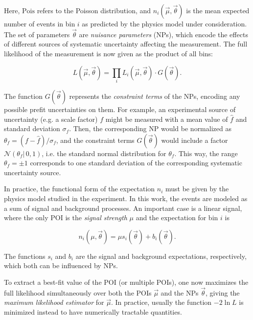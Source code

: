 Here, $\mathrm{Pois}$ refers to the Poisson distribution, and $n_i (\vec{\mu}, \vec{\theta})$ is the mean expected number of events in bin $i$ as predicted by the physics model under consideration. The set of parameters $\vec{\theta}$ are \textit{nuisance parameters} (NPs), which encode the effects of different sources of systematic uncertainty affecting the measurement. The full likelihood of the measurement is now given as the product of all bins:

\begin{equation}
    L (\vec{\mu}, \vec{\theta}) = \prod_i L_i (\vec{\mu}, \vec{\theta}) \cdot G(\vec{\theta}).
\end{equation}

The function $G(\vec{\theta})$ represents the \textit{constraint terms} of the NPs, encoding any possible prefit uncertainties on them. For example, an experimental source of uncertainty (e.g. a scale factor) $f$ might be measured with a mean value of $\hat{f}$ and standard deviation $\sigma_f$. Then, the corresponding NP would be normalized as $\theta_f = (f-\hat{f})/\sigma_f$, and the constraint terms $G(\vec{\theta})$ would include a factor $\mathcal{N}(\theta_f | \, 0,1)$, i.e. the standard normal distribution for $\theta_f$. This way, the range $\theta_f = \pm 1$ corresponds to one standard deviation of the corresponding systematic uncertainty source.

In practice, the functional form of the expectation $n_i$ must be given by the physics model studied in the experiment. In this work, the events are modeled as a sum of signal and background processes. An important case is a linear signal, where the only POI is the \textit{signal strength} $\mu$ and the expectation for bin $i$ is

\begin{equation}
\label{eq:methods:linearsignal}
    n_i (\mu, \vec{\theta}) = \mu s_i (\vec{\theta}) + b_i (\vec{\theta}).
\end{equation}

The functions $s_i$ and $b_i$ are the signal and background expectations, respectively, which both can be influenced by NPs. 

To extract a best-fit value of the POI (or multiple POIs), one now maximizes the full likelihood simultaneously over both the POIs $\vec{\mu}$ and the NPs $\vec{\theta}$, giving the \textit{maximum likelihood estimator} for $\vec{\mu}$. In practice, usually the function $-2 \ln L$ is minimized instead to have numerically tractable quantities. 

